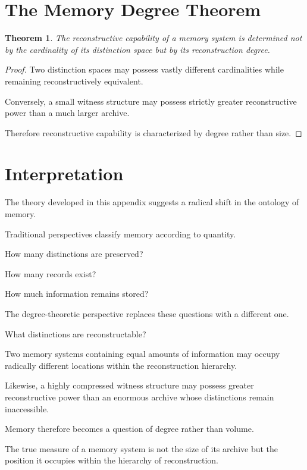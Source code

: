 \documentclass[12pt,oneside]{book}
\theoremstyle{plain} \newtheorem{theorem}{Theorem}[chapter] \newtheorem{lemma}[theorem]{Lemma} \newtheorem{proposition}[theorem]{Proposition} \newtheorem{corollary}[theorem]{Corollary}
\theoremstyle{definition} \newtheorem{definition}[theorem]{Definition} \newtheorem{axiom}[theorem]{Axiom} \newtheorem{construction}[theorem]{Construction}
\theoremstyle{remark} \newtheorem{remark}[theorem]{Remark} \newtheorem{example}[theorem]{Example}
\begin{document}
\section{The Memory Degree Theorem}

\begin{theorem}

The reconstructive capability of a memory system is determined not by the cardinality of its distinction space but by its reconstruction degree.

\end{theorem}

\begin{proof}

Two distinction spaces may possess vastly different cardinalities while remaining reconstructively equivalent.

Conversely, a small witness structure may possess strictly greater reconstructive power than a much larger archive.

Therefore reconstructive capability is characterized by degree rather than size.

\end{proof}

\section{Interpretation}

The theory developed in this appendix suggests a radical shift in the ontology of memory.

Traditional perspectives classify memory according to quantity.

How many distinctions are preserved?

How many records exist?

How much information remains stored?

The degree-theoretic perspective replaces these questions with a different one.

What distinctions are reconstructable?

Two memory systems containing equal amounts of information may occupy radically different locations within the reconstruction hierarchy.

Likewise, a highly compressed witness structure may possess greater reconstructive power than an enormous archive whose distinctions remain inaccessible.

Memory therefore becomes a question of degree rather than volume.

The true measure of a memory system is not the size of its archive but the position it occupies within the hierarchy of reconstruction.
\end{document}
